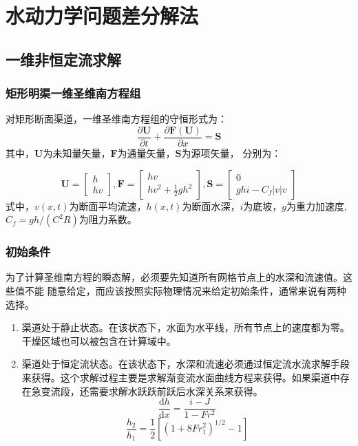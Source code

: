\chapter{水动力学问题差分解法}
\section{一维非恒定流求解}
\subsection{矩形明渠一维圣维南方程组}
对矩形断面渠道，一维圣维南方程组的守恒形式为：
\begin{equation}
  \frac{\partial \mathbf{U}}{\partial t} +
  \frac{\partial \mathbf{F}(\mathbf{U})}{\partial x} =
  \mathbf{S}
\end{equation}
其中，$\mathbf{U}$为未知量矢量，$\mathbf{F}$为通量矢量，$\mathbf{S}$为源项矢量，
分别为：

\begin{equation}
  \mathbf{U} = 
  \begin{bmatrix}
    h \\
    hv
  \end{bmatrix}
  ,
  \mathbf{F} = 
  \begin{bmatrix}
    hv \\
    hv^{2} + \frac{1}{2}gh^{2}
  \end{bmatrix}
  ,
  \mathbf{S} = 
  \begin{bmatrix}
    0 \\
    ghi - C_{f}|v|v
  \end{bmatrix}
\end{equation}
式中，$v(x,t)$为断面平均流速，$h(x,t)$为断面水深，$i$为底坡，$g$为重力加速度,
$C_{f}=gh/(C^{2}R)$为阻力系数。

\subsection{初始条件}
为了计算圣维南方程的瞬态解，必须要先知道所有网格节点上的水深和流速值。这些值不能
随意给定，而应该按照实际物理情况来给定初始条件，通常来说有两种选择。
\begin{enumerate}
  \item 渠道处于静止状态。在该状态下，水面为水平线，所有节点上的速度都为零。干燥区域也可以被包含在计算域中。
  \item 渠道处于恒定流状态。在该状态下，水深和流速必须通过恒定流水流求解手段来获得。这个求解过程主要是求解渐变流水面曲线方程来获得。如果渠道中存在急变流段，还需要求解水跃跃前跃后水深关系来获得。
    \begin{equation}
    \frac{\mathrm{d}h}{\mathrm{d}x}
    =
    \frac{i - J }{1 - Fr^{2 }}
    \end{equation}
    \begin{equation}
      \frac{h_{2 }}{h_{1 }}
      =
      \frac{1}{2 }
      [(1+8{Fr}_{1}^{2})^{1/2} - 1]
    \end{equation}
\end{enumerate}

